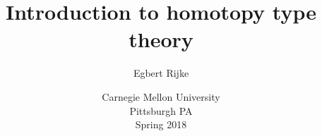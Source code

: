 \documentclass[11pt]{memoir} %
\title{Introduction to homotopy type theory}
\author{Egbert Rijke}
\date{Carnegie Mellon University\\Pittsburgh PA\\Spring 2018}
\begin{document}
\frontmatter

\begin{titlingpage}
\maketitle 
\end{titlingpage}

\tableofcontents

%



\mainmatter 















































\end{document}

